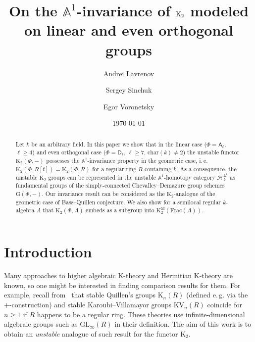 \documentclass[oneside, 11pt]{amsart} \pdfoutput=1
\title{On the $\mathbb{A}^1$-invariance of $\K_2$ modeled on linear and even orthogonal groups}
\author[1] {Andrei Lavrenov} \email{avlavrenov at gmail.com}
\author[2] {Sergey Sinchuk} \email{sinchukss at gmail.com}
\author[3] {Egor Voronetsky} \email{voronetckiiegor at yandex.ru}
\date {\today}
\newcommand{\K}{{\mathrm{K}}}
\numberwithin{equation}{section}
\theoremstyle{definition}
\newcommand{\rA}{\mathsf{A}}
\newcommand{\rD}{\mathsf{D}}
\begin{document}
\begin{abstract}
 Let $k$ be an arbitrary field. In this paper we show that in the linear case ($\Phi=\rA_\ell$, $\ell \geq 4$) and even orthogonal case ($\Phi = \rD_\ell$, $\ell\geq 7$, $\mathrm{char}(k)\neq 2$) the unstable functor $\mathrm{K}_2(\Phi, -)$ possesses the $\mathbb{A}^1$-invariance property in the geometric case, i.\,e. $\K_2(\Phi, R[t]) = \K_2(\Phi, R)$ for a regular ring $R$ containing $k$. As a consequence, the unstable $\K_2$ groups can be represented in the unstable $\mathbb{A}^1$-homotopy category $\mathcal{H}^{\mathbb{A}^1}_{k}$ as fundamental groups of the simply-connected Chevalley--Demazure group schemes $\mathrm{G}(\Phi,-)$. Our invariance result can be considered as the $\K_2$-analogue of the geometric case of Bass--Quillen conjecture. We also show for a semilocal regular $k$-algebra $A$ that $\K_2(\Phi, A)$ embeds as a subgroup into $\K^\mathrm{M}_2(\mathrm{Frac}(A))$.
\end{abstract}

\maketitle

\section{Introduction}
Many approaches to higher algebraic $\K$-theory and Hermitian $\K$-theory are known, so one might be interested in finding comparison results for them.
For example, recall from~\cite[Theorem~IV.11.8]{Kbook} that stable Quillen's groups $\K_n(R)$ (defined e.\,g. via the $+$-construction) and stable Karoubi--Villamayor groups $\mathrm{KV}_n(R)$ coincide for $n\geq 1$ if $R$ happens to be a regular ring.
These theories use infinite-dimensional algebraic groups such as $\mathrm{GL}_\infty(R)$ in their definition. 
The aim of this work is to obtain an {\it unstable} analogue of such result for the functor $\K_2$.
\end{document}
